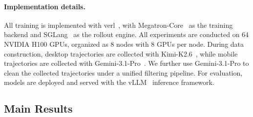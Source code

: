 \paragraph{Implementation details.}
All training is implemented with verl~\cite{verl}, with Megatron-Core~\citep{megatron} as the training backend and SGLang~\citep{sglang} as the rollout engine. All experiments are conducted on 64 NVIDIA H100 GPUs, organized as 8 nodes
with 8 GPUs per node.
During data construction, desktop trajectories are collected with
Kimi-K2.6~\cite{kimi}, while mobile trajectories are collected with
Gemini-3.1-Pro~\citep{Gemini3.1}. We further use Gemini-3.1-Pro to clean the
collected trajectories under a unified filtering pipeline. For evaluation,
models are deployed and served with the vLLM~\citep{vllm} inference framework.







\subsection{Main Results}
\label{sec:exp_main_results}

